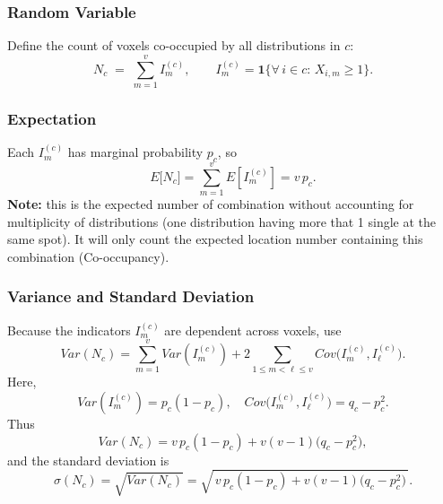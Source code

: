 \documentclass{article}
\begin{document}
\subsubsection{Random Variable}

Define the count of voxels co-occupied by all distributions in \(c\):
\[
N_c \;=\;\sum_{m=1}^v I^{(c)}_m,
\qquad
I^{(c)}_m = \mathbf{1}\{\forall\,i\in c:\,X_{i,m}\ge1\}.
\]

\subsubsection{Expectation}

Each \(I^{(c)}_m\) has marginal probability \(p_c\), so
\[
E\bigl[N_c\bigr]
= \sum_{m=1}^v E[I^{(c)}_m]
= v\,p_c.
\]
\textbf{Note:} this is the expected number of combination without accounting for multiplicity of distributions (one distribution having more that 1
single at the same spot). It will only count the expected location number containing this combination (Co-occupancy). 

\subsubsection{Variance and Standard Deviation}

Because the indicators \(I^{(c)}_m\) are dependent across voxels, use
\[
Var(N_c)
= \sum_{m=1}^v Var(I^{(c)}_m)
  + 2\sum_{1\le m<\ell\le v} Cov\bigl(I^{(c)}_m, I^{(c)}_\ell\bigr).
\]
Here,
\[
Var(I^{(c)}_m) = p_c(1-p_c),
\quad
Cov\bigl(I^{(c)}_m, I^{(c)}_\ell\bigr) = q_c - p_c^2.
\]
Thus
\[
Var(N_c)
= v\,p_c(1-p_c)
  + v(v-1)\bigl(q_c - p_c^2\bigr),
\]
and the standard deviation is
\[
\sigma(N_c)
= \sqrt{Var(N_c)} 
= \sqrt{\,v\,p_c(1-p_c) + v(v-1)\bigl(q_c - p_c^2\bigr)\,}.
\]


\begin{figure}[h]
\centering
\end{figure}
\end{document}

